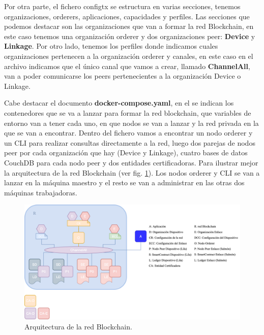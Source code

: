 \vspace{10mm}

\noindent Por otra parte, el fichero configtx se estructura en varias secciones, tenemos organizaciones, orderers,  
aplicaciones, capacidades y perfiles. Las secciones que podemos destacar son las organizaciones que van a formar la red 
Blockchain, en este caso tenemos una organización orderer y dos organizaciones peer: \textbf{Device} y \textbf{Linkage}. 
Por otro lado, tenemos los perfiles donde indicamos cuales organizaciones pertenecen a la organización orderer y canales, 
en este caso en el archivo indicamos que el único canal que vamos a crear, llamado \textbf{ChannelAll}, van a poder 
comunicarse los peers pertenecientes a la organización Device o Linkage.

\vspace{5mm}

\noindent Cabe destacar el documento \textbf{docker-compose.yaml}, en el se indican los contenedores que se va a lanzar 
para formar la red blockchain, que variables de entorno van a tener cada uno, en que nodos se van a lanzar y la red 
privada en la que se van a encontrar. Dentro del fichero vamos a encontrar un nodo orderer y un CLI para realizar 
consultas directamente a la red, luego dos parejas de nodos peer por cada organización que hay (Device y Linkage), 
cuatro bases de datos CouchDB para cada nodo peer y dos entidades certificadoras. Para ilustrar mejor la arquitectura de 
la red Blockchain (ver fig. \ref{fig:arquitectura-blockchain}). Los nodos orderer y CLI se van a lanzar en la máquina 
maestro y el resto se van a administrar en las otras dos máquinas trabajadoras.

\begin{figure}[h!]
  \centering
  \includegraphics[width=\textwidth]{imagenes/desarrollo/arquitectura_networkiot}
  \caption{Arquitectura de la red Blockchain.}
  \label{fig:arquitectura-blockchain}
\end{figure}

